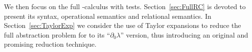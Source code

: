 \documentclass{LMCS}
\newcommand{\dzlam}{\ensuremath{\partial_0\lambda}}
\begin{document}
We then focus on the full -calculus with tests.
Section~\ref{sec:FullRC} is devoted to present its syntax, operational
semantics and relational semantics.  In Section~\ref{sec:TaylorExp} we
consider the use of Taylor expansions to reduce the full abstraction
problem for  to its ``\dzlam'' version, thus introducing an
original and promising reduction technique.
 


\renewcommand{\phi}{\varphi}
\renewcommand\epsilon{\varepsilon}
\renewcommand\sharp{\#}
\newcommand\Eqref[1]{(\ref{#1})}

\newcommand{\Iff}{\quad\hbox{iff}\quad}
\newcommand{\Implies}{\Rightarrow}
\newcommand\Equiv{\Leftrightarrow}
\newcommand{\St}{\mid}

\newcommand{\Ro}{\circ}
\newcommand{\Inf}{\bigwedge}
\newcommand{\Infi}{\wedge}
\newcommand{\Sup}{\bigvee}
\newcommand{\Supi}{\vee}


\newcommand{\arrow}{\rightarrow}
\renewcommand{\Bot}{{\mathord{\perp}}}
\newcommand{\Top}{\top}

\newcommand\Seqempty{\langle\rangle}

\newcommand\Fini{{\mathrm{fin}}}



\def\frownsmile{\mathrel{\vbox{\hbox{}\vspace{-2ex}\hbox{}\vspace{-.5ex}}}}
\def\smilefrown{\mathrel{\vbox{\hbox{}\vspace{-2ex}\hbox{}\vspace{-.5ex}}}}

\newcommand\Part[1]{{\cal P}({#1})}

\newcommand\Union{\bigcup}

\newcommand{\Linarrow}{\multimap}

\def\frownsmile{\mathrel{\vbox{\hbox{}\vspace{-2ex}\hbox{}\vspace{-.5ex}}}}
\def\smilefrown{\mathrel{\vbox{\hbox{}\vspace{-2ex}\hbox{}\vspace{-.5ex}}}}

\newcommand\CScoh[3]{{#2}\mathrel{\frownsmile_{{#1}}}{#3}}
\newcommand\CScohs[3]{{#2}\mathrel{{\frown}_{#1}}{#3}}
\newcommand\CScohstr[3]{\CScohs{#1}{#2}{#3}}
\newcommand\CSincoh[3]{{#2}\mathrel{\smilefrown_{{#1}}}{#3}}
\newcommand\CSincohs[3]{{#2}\mathrel{{\smile}_{#1}}{#3}}
\newcommand\CSeq[3]{{#2}\mathrel{{=}_{#1}}{#3}}

\newcommand\Myleft{}
\newcommand\Myright{}
\end{document}
